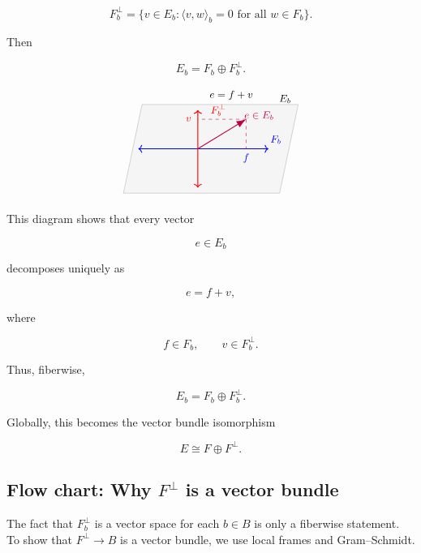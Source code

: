 \documentclass[12pt,a4paper]{article}
\theoremstyle{notespace}
\begin{document}
	\[
	F_b^\perp
	=
	\{v\in E_b:\langle v,w\rangle_b=0
	\text{ for all }w\in F_b\}.
	\]
	
	Then
	
	\[
	E_b=F_b\oplus F_b^\perp.
	\]
	
	\[
	\begin{tikzpicture}[scale=1.15, every node/.style={font=\small}]
		
		\draw[fill=gray!8, draw=gray!60] (-2,-1.2) -- (2.2,-1.2) -- (2.7,1.2) -- (-1.5,1.2) -- cycle;
		\node at (2.35,1.35) {\(E_b\)};
		
		\draw[<->, thick, blue] (-1.6,0) -- (1.9,0);
		\node[blue] at (2.1,0.25) {\(F_b\)};
		
		\draw[<->, thick, red] (0,-1.05) -- (0,1.05);
		\node[red] at (0.55,1.05) {\(F_b^\perp\)};
		
		\draw[-{Latex[length=3mm]}, thick, purple] (0,0) -- (1.3,0.8);
		\node[purple] at (1.65,0.9) {\(e\in E_b\)};
		
		\draw[dashed, purple] (1.3,0.8) -- (1.3,0);
		\draw[dashed, purple] (1.3,0.8) -- (0,0.8);
		
		\node[blue] at (1.3,-0.25) {\(f\)};
		\node[red] at (-0.25,0.8) {\(v\)};
		\node at (0.9,1.45) {\(e=f+v\)};
		
	\end{tikzpicture}
	\]
	
	This diagram shows that every vector
	
	\[
	e\in E_b
	\]
	
	decomposes uniquely as
	
	\[
	e=f+v,
	\]
	
	where
	
	\[
	f\in F_b,
	\qquad
	v\in F_b^\perp.
	\]
	
	Thus, fiberwise,
	
	\[
	E_b=F_b\oplus F_b^\perp.
	\]
	
	Globally, this becomes the vector bundle isomorphism
	
	\[
	\boxed{
		E\cong F\oplus F^\perp.
	}
	\]
	
	\subsection{Flow chart: Why \(F^\perp\) is a vector bundle}
	
	The fact that \(F_b^\perp\) is a vector space for each \(b\in B\) is only a fiberwise statement. To show that \(F^\perp\to B\) is a vector bundle, we use local frames and Gram--Schmidt.
	
\end{document}
